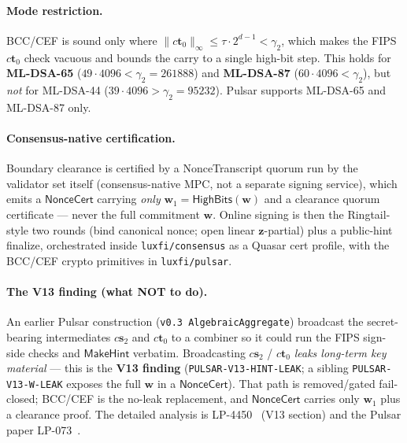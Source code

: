 \paragraph{Mode restriction.}  BCC/CEF is sound only where
$\|c\mathbf{t}_0\|_\infty \leq \tau \cdot 2^{d-1} < \gamma_2$, which
makes the FIPS $c\mathbf{t}_0$ check vacuous and bounds the carry to a
single high-bit step.  This holds for \textbf{ML-DSA-65}
($49 \cdot 4096 < \gamma_2 = 261888$) and \textbf{ML-DSA-87}
($60 \cdot 4096 < \gamma_2$), but \emph{not} for ML-DSA-44
($39 \cdot 4096 > \gamma_2 = 95232$).  Pulsar supports ML-DSA-65 and
ML-DSA-87 only.

\paragraph{Consensus-native certification.}  Boundary clearance is
certified by a NonceTranscript quorum run by the validator set itself
(consensus-native MPC, not a separate signing service), which emits a
$\mathsf{NonceCert}$ carrying \emph{only} $\mathbf{w}_1 =
\mathsf{HighBits}(\mathbf{w})$ and a clearance quorum certificate ---
never the full commitment $\mathbf{w}$.  Online signing is then the
Ringtail-style two rounds (bind canonical nonce; open linear
$\mathbf{z}$-partial) plus a public-hint finalize, orchestrated inside
\texttt{luxfi/consensus} as a Quasar cert profile, with the BCC/CEF
crypto primitives in \texttt{luxfi/pulsar}.

\paragraph{The V13 finding (what NOT to do).}  An earlier Pulsar
construction (\texttt{v0.3 AlgebraicAggregate}) broadcast the
secret-bearing intermediates $c\mathbf{s}_2$ and $c\mathbf{t}_0$ to a
combiner so it could run the FIPS sign-side checks and $\mathsf{MakeHint}$
verbatim.  Broadcasting $c\mathbf{s}_2$ / $c\mathbf{t}_0$ \emph{leaks
long-term key material} --- this is the \textbf{V13 finding}
(\texttt{PULSAR-V13-HINT-LEAK}; a sibling \texttt{PULSAR-V13-W-LEAK}
exposes the full $\mathbf{w}$ in a $\mathsf{NonceCert}$).  That path is
removed/gated fail-closed; BCC/CEF is the no-leak replacement, and
$\mathsf{NonceCert}$ carries only $\mathbf{w}_1$ plus a clearance proof.
The detailed analysis is LP-4450~\cite{lp4450} (V13 section) and the
Pulsar paper LP-073~\cite{lp073}.

